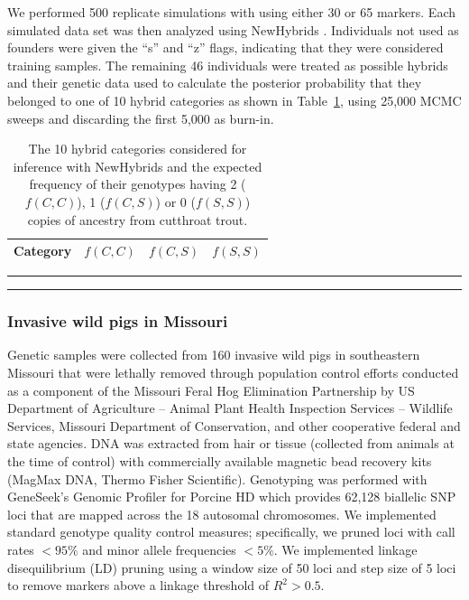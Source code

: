 {We performed 500 replicate simulations with \gscramble{} using either 30 or 65 markers.  Each
simulated data set was then analyzed using {\sc NewHybrids} \citep{anderson2002model}. Individuals not used as founders were given the ``s'' and ``z'' flags, indicating that they were considered training samples.  The remaining 46 individuals were treated as possible hybrids and their genetic data used to calculate the posterior probability that they belonged to one of 10 hybrid categories as shown in Table~\ref{tab:newhybcats}, using 25,000 MCMC sweeps and discarding the first 5,000 as burn-in.
\begin{table}
\caption{The 10 hybrid categories considered for inference with {\sc NewHybrids} and the
expected frequency of their genotypes having 2 ($f(C,C)$), 1 ($f(C,S)$) or 0 ($f(S,S)$) copies of ancestry from cutthroat trout.}
\label{tab:newhybcats}
\begin{center}
{\small
\begin{tabular*}{0.48\textwidth}{@{\extracolsep{\fill}} lrrr}
\hline\hline
Category	& $f(C,C)$ &	$f(C,S)$ & 	$f(S,S)$ \\ \hline

\end{tabular*}
}
\vspace*{-2.3ex}\hrule\vspace*{0.3ex}\hrule
\end{center}
\end{table}



\subsubsection*{Invasive wild pigs in Missouri}

Genetic samples were collected from 160 invasive wild pigs in southeastern
Missouri that were lethally removed through population control efforts
conducted as a component of the Missouri Feral Hog Elimination Partnership
by US Department of Agriculture – Animal Plant Health Inspection Services –
Wildlife Services, Missouri Department of Conservation, and other cooperative
federal and state agencies.
DNA was extracted from hair or tissue (collected from animals at the time of control) with
commercially available magnetic bead recovery kits (MagMax DNA, Thermo Fisher Scientific).
Genotyping was performed with GeneSeek’s Genomic Profiler for Porcine HD which provides
62,128 biallelic SNP loci that are mapped across the 18 autosomal chromosomes.
We implemented standard genotype quality control measures; specifically, we pruned loci with
call rates $<95\%$ and minor allele frequencies $<5\%$.
We implemented linkage disequilibrium (LD) pruning using a window size of 50 loci and step size
of 5 loci to remove markers above a linkage threshold of $R^2 > 0.5$.

}
